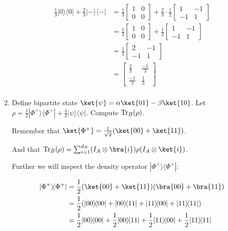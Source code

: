 \documentclass{article}
\def\I{I}
\newcommand{\ketbra}[2]{|#1\rangle\!\langle #2|}
\newcommand{\trace}{{\rm Tr}}
\begin{document}
\begin{enumerate}
        $$\begin{aligned}
            \frac{1}{3}\ketbra{0}{0}+\frac{2}{3}\ketbra{-}{-} & =\frac{1}{3}\begin{bmatrix}1&0\\0&0\end{bmatrix}+\frac{2}{3}\cdot\frac{1}{2}\begin{bmatrix}1&-1\\-1&1\end{bmatrix} \\
                                                              & =\frac{1}{3}\begin{bmatrix}1&0\\0&0\end{bmatrix}+\frac{1}{3}\begin{bmatrix}1&-1\\-1&1\end{bmatrix}                 \\
                                                              & =\frac{1}{3}\begin{bmatrix}2&-1\\-1&1\end{bmatrix}                                                                 \\
                                                              & =\begin{bmatrix}\frac23&\frac{-1}3\\\frac{-1}3&\frac13\end{bmatrix}                                                \\
          \end{aligned}$$
  \item  Define bipartite state $\ket{\psi}=\alpha\ket{01}-\beta\ket{10}$. Let $\rho=\frac{1}{2}\ketbra{\Phi^+}{\Phi^+} + \frac{1}{2}\ketbra{\psi}{\psi}$. Compute $\trace_B(\rho)$.

        Remember that $\ket{\Phi^+}=\frac{1}{\sqrt{2}}(\ket{00}+\ket{11})$.

        And that $\trace_B(\rho)=\sum_{i=1}^{d_B}(\I_A\otimes\bra{i})\rho(\I_A\otimes\ket{i})$.

        Further we will inspect the density operator $\ketbra{\Phi^+}{\Phi^+}$:

        $$\begin{aligned}
            \ketbra{\Phi^+}{\Phi^+} & = \frac{1}{2}(\ket{00}+\ket{11})(\bra{00}+\bra{11})                                           \\
                                    & = \frac{1}{2}(\ketbra{00}{00}+\ketbra{00}{11}+\ketbra{11}{00}+\ketbra{11}{11})                \\
                                    & = \frac12\ketbra{00}{00}+\frac12\ketbra{00}{11}+\frac12\ketbra{11}{00}+\frac12\ketbra{11}{11} \\
          \end{aligned}$$


\end{enumerate}
\end{document}

